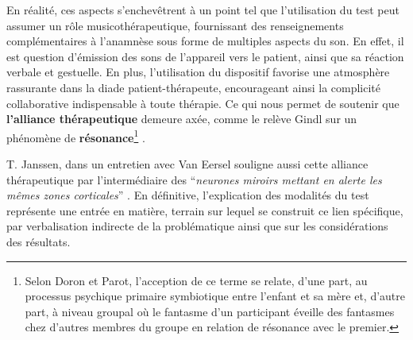 En réalité, ces aspects s'enchevêtrent à un point tel que
l'utilisation du test peut assumer un rôle musicothérapeutique, fournissant des
  renseignements complémentaires à l'anamnèse sous forme de multiples
  aspects du son. En effet, il est  question d'émission des sons de
  l'appareil vers le patient, ainsi que sa réaction verbale et gestuelle.
En plus, l'utilisation
   du dispositif favorise une atmosphère rassurante dans la diade
   patient-thérapeute, encourageant ainsi la complicité collaborative
 indispensable à toute
 thérapie.
Ce qui nous permet de soutenir que
 \textbf{l'alliance thérapeutique} demeure axée, comme le relève Gindl
  \autocite{gindl} sur
 un phénomène de \textbf{résonance}\footnote{Selon Doron et Parot, l'acception de ce terme se relate, d'une part, au processus psychique
primaire symbiotique entre l'enfant et sa mère et, d'autre part, à
niveau groupal où le fantasme d'un participant éveille des fantasmes chez d'autres membres du groupe en relation
de résonance  avec le premier.} \autocite{doronparot}.

T. Janssen, dans un entretien
avec Van Eersel
souligne aussi cette alliance thérapeutique
par l'intermédiaire des ``\textit{neurones
 miroirs mettant en alerte les mêmes zones corticales}'' \autocite[203]{van_eersel_cerveau}.
En définitive, l'explication des modalités du test représente une
  entrée en matière, terrain  sur lequel se construit ce lien spécifique,
  par verbalisation indirecte de la problématique ainsi que sur
  les considérations des résultats.

